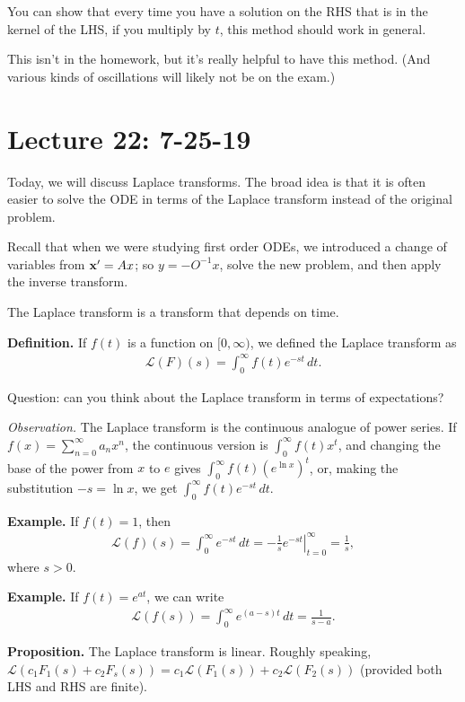 \documentclass{article}
\newcommand{\LL}{\mathcal{L}}
\begin{document}
You can show that every time you have a solution on the RHS that is in the kernel of the LHS, if you multiply by $t$, this method should work in general.

This isn't in the homework, but it's really helpful to have this method.  (And various kinds of oscillations will likely not be on the exam.)

\section{Lecture 22: 7-25-19}

Today, we will discuss Laplace transforms.  The broad idea is that it is often easier to solve the ODE in terms of the Laplace transform instead of the original problem.

Recall that when we were studying first order ODEs, we introduced a change of variables from $\mathbf{x}' = Ax$; so $y = -O^{-1} x$, solve the new problem, and then apply the inverse transform.

The Laplace transform is a transform that depends on time.

{\bf Definition.} If $f(t)$ is a function on $[0, \infty)$, we defined the Laplace transform as 
\begin{align*}
  \LL(F)(s) = \int_{0}^{\infty} f(t) e^{-st} \, dt.
\end{align*}

Question: can you think about the Laplace transform in terms of expectations?

{\it Observation.} The Laplace transform is the continuous analogue of power series.  If $f(x) = \sum_{n=0}^{\infty} a_n x^n$, the continuous version is $\int_{0}^{\infty} f(t) x^t$, and changing the base of the power from $x$ to $e$ gives $\int_{0}^{\infty} f(t) (e^{\ln x})^t$, or, making the substitution $-s = \ln x$, we get $\int_{0}^{\infty} f(t) e^{-st} \, dt$.

{\bf Example.} If $f(t) = 1$, then
\begin{align*}
  \LL(f)(s) = \int_{0}^{\infty} e^{-st} \, dt = \left . - \frac{1}{s} e^{-st} \right |_{t=0}^{\infty} = \frac{1}{s},
\end{align*}
where $s > 0$.

{\bf Example.} If $f(t) = e^{at}$, we can write
\begin{align*}
  \LL(f(s)) = \int_{0}^{\infty} e^{(a - s) t} \, dt = \frac{1}{s-a}.
\end{align*}


{\bf Proposition.} The Laplace transform is linear.  Roughly speaking, $\LL(c_1 F_1(s) + c_2 F_s(s)) = c_1 \LL(F_1(s)) + c_2 \LL(F_2(s))$ (provided both LHS and RHS are finite).
\end{document}

